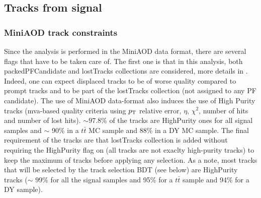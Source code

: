\documentclass{cernatlasnote}
\newcommand{\pt}{$p_{\text T}$\xspace}
\begin{document}
\subsection{Tracks from signal}
\label{SUB:BDTRK}

\subsubsection{MiniAOD track constraints}
Since the analysis is performed in the MiniAOD data format, there are several flags that have to be taken care of. The first one is that in this analysis, both packedPFCandidate and lostTracks collections are considered, more details in \cite{MiniAOD}. Indeed, one can expect displaced tracks to be of worse quality compared to prompt tracks and to be part of the lostTracks collection (not assigned to any PF candidate). The use of MiniAOD data-format also induces the use of High Purity tracks  (mva-based quality criteria using \pt relative error, $\eta$, $\chi^2$, number of hits and number of lost hits). $\sim 97.8$\% of the tracks are HighPurity ones for all signal samples and $\sim$ 90\% in a $t\bar{t}$ MC sample and 88\% in a DY MC sample. The final requirement of the tracks are that lostTracks collection is added without requiring the HighPurity flag on (all tracks are not exaclty high-purity tracks) to keep the maximum of tracks before applying any selection. As a note, most tracks that will be selected by the track selection BDT (see below) are HighPurity tracks ($\sim$ 99\% for all the signal samples and 95\% for a $t\bar{t}$ sample and 94\% for a DY sample).

        
\end{document}
